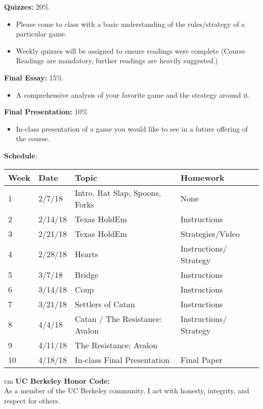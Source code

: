\documentclass[11.5pt]{article}
\begin{document}
\begin{description}
\item \textbf{Quizzes:} 20\% 
\end{description}

\begin{itemize}
\item Please come to class with a basic understanding of the rules/strategy of a
particular game. 
\item Weekly quizzes will be assigned to ensure readings were complete (Course
Readings are mandatory, further readings are heavily suggested.)
\end{itemize}

\begin{description}
\item \textbf{Final Essay:} 15\% 
\end{description}

\begin{itemize}
\item A comprehensive analysis of your favorite game and the strategy around it.
\end{itemize}

\begin{description}
\item \textbf{Final Presentation:} 10\% 
\end{description}

\begin{itemize}
\item In-class presentation of a game you would like to see in a future offering of the course.
\end{itemize}
\newpage

\noindent\textbf{\large Schedule}: \vspace*{0.05cm}
\flushleft
\begin{tabular}{ |p{0.8cm}||p{3cm}|p{7cm}|p{4cm}|  }
 \hline
 Week & Date & Topic & Homework \\
 \hline
1  & 2/7/18 & Intro, Rat Slap, Spoons, Forks & None \\ \hline
2 &  2/14/18  & Texas HoldEm  & Instructions \\ \hline
3 & 2/21/18 & Texas HoldEm & Strategies/Video \\ \hline
4 & 2/28/18  & Hearts & Instructions/ Strategy\\ \hline
5 & 3/7/18 & Bridge &  Instructions \\ \hline
6 & 3/14/18 & Coup & Instructions \\ \hline
7 & 3/21/18 & Settlers of Catan & Instructions \\ \hline
8 & 4/4/18 & Catan / The Resistance: Avalon & Instructions/ Strategy \\ \hline
9 & 4/11/18 & The Resistance: Avalon &  \\ \hline
10 & 4/18/18 & In-class Final Presentation & Final Paper \\
\hline
\end{tabular}
 cm
\noindent\textbf{UC Berkeley Honor Code:} \\
As a member of the UC Berkeley community, I act with honesty, integrity, and respect for others.
\end{document}
